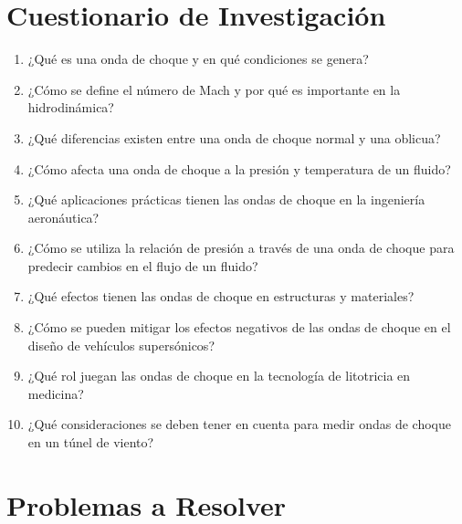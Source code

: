 \documentclass[../main]{subfiles}
\begin{document}
\section{Cuestionario de Investigación}

\begin{enumerate}
    \item ¿Qué es una onda de choque y en qué condiciones se genera?
    \item ¿Cómo se define el número de Mach y por qué es importante en la hidrodinámica?
    \item ¿Qué diferencias existen entre una onda de choque normal y una oblicua?
    \item ¿Cómo afecta una onda de choque a la presión y temperatura de un fluido?
    \item ¿Qué aplicaciones prácticas tienen las ondas de choque en la ingeniería aeronáutica?
    \item ¿Cómo se utiliza la relación de presión a través de una onda de choque para predecir cambios en el flujo de un fluido?
    \item ¿Qué efectos tienen las ondas de choque en estructuras y materiales?
    \item ¿Cómo se pueden mitigar los efectos negativos de las ondas de choque en el diseño de vehículos supersónicos?
    \item ¿Qué rol juegan las ondas de choque en la tecnología de litotricia en medicina?
    \item ¿Qué consideraciones se deben tener en cuenta para medir ondas de choque en un túnel de viento?

\end{enumerate}

\section{Problemas a Resolver}
\end{document}
